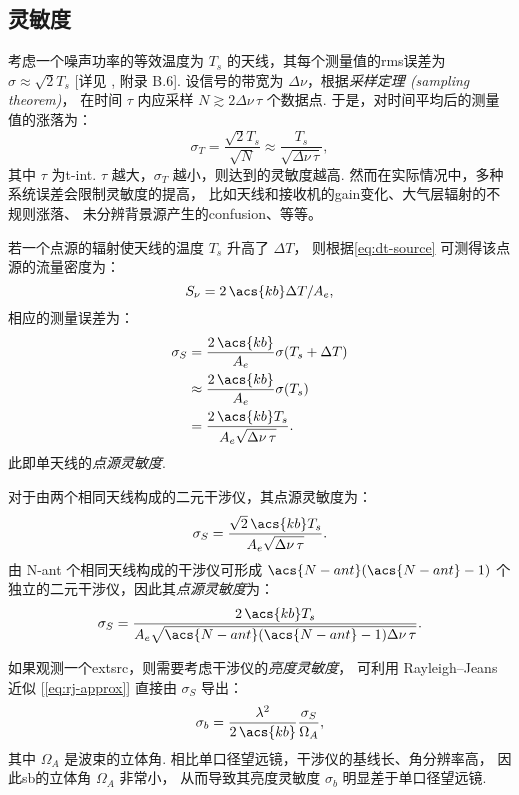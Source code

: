 \subsection{灵敏度}

考虑一个噪声功率的等效温度为 $T_s$ 的天线，其每个测量值的\ac{rms}误差为
$\sigma \approx \sqrt{2} T_s$
[详见 , 附录 B.6].
设信号的带宽为 $\Delta\nu$，根据\emph{采样定理 (sampling theorem)}，
在时间 $\tau$ 内应采样 $N \gtrsim 2 \Delta\nu \,\tau$ 个数据点.
于是，对时间平均后的测量值的涨落为：
\begin{equation}
  \label{eq:radiometer}
  \sigma_T = \frac{\sqrt{2} T_s}{\sqrt{N}}
    \approx \frac{T_s}{\sqrt{\Delta\nu \,\tau}} ,
\end{equation}
其中 $\tau$ 为\ac{t-int}.
$\tau$ 越大，$\sigma_T$ 越小，则达到的灵敏度越高.
然而在实际情况中，多种系统误差会限制灵敏度的提高，
比如天线和接收机的\acl{gain}变化、大气层辐射的不规则涨落、
未分辨背景源产生的\ac{confusion}、等等。

若一个点源的辐射使天线的温度 $T_s$ 升高了 $\Delta T$，
则根据\autoref{eq:dt-source} 可测得该点源的流量密度为：
\begin{equation}
  S_{\nu} = 2\,\acs{kb} \Delta T / A_e ,
\end{equation}
相应的测量误差为：
\begin{align}
  \sigma_S
    & = \frac{2\,\acs{kb}}{A_e} \sigma(T_s + \Delta T) \\
    & \approx \frac{2\,\acs{kb}}{A_e} \sigma(T_s) \\
    & = \frac{2\,\acs{kb} T_s}{A_e \sqrt{\Delta\nu \,\tau}} .
\end{align}
此即单天线的\emph{点源灵敏度}.

对于由两个相同天线构成的二元干涉仪，其点源灵敏度为：
\begin{equation}
  \label{eq:sigma-ps1}
  \sigma_S = \frac{\sqrt{2}\,\acs{kb} T_s}{A_e \sqrt{\Delta\nu \,\tau}} .
\end{equation}
由 \acs{N-ant} 个相同天线构成的干涉仪可形成 $\acs{N-ant}(\acs{N-ant}-1)$
个独立的二元干涉仪，因此其\emph{点源灵敏度}为：
\begin{equation}
  \label{eq:sigma-ps}
  \sigma_S = \frac{2\,\acs{kb} T_s}{
    A_e \sqrt{\acs{N-ant}(\acs{N-ant}-1) \Delta\nu \,\tau}} .
\end{equation}

如果观测一个\acf{extsrc}，则需要考虑干涉仪的\emph{亮度灵敏度}，
可利用 Rayleigh--Jeans 近似 [\autoref{eq:rj-approx}]
直接由 $\sigma_S$ 导出：
\begin{equation}
  \label{eq:sigma-tb}
  \sigma_b = \frac{\lambda^2}{2\,\acs{kb}} \frac{\sigma_S}{\Omega_A} ,
\end{equation}
其中 $\Omega_A$ 是波束的立体角.
相比单口径望远镜，干涉仪的基线长、角分辨率高，
因此\acl{sb}的立体角 $\Omega_A$ 非常小，
从而导致其亮度灵敏度 $\sigma_b$ 明显差于单口径望远镜.


